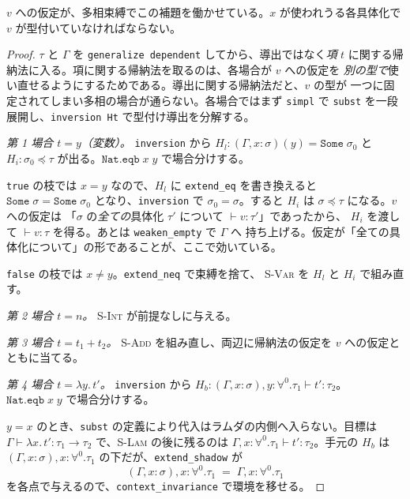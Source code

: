 \documentclass[11pt,a4paper]{ltjsarticle}
\newcommand{\inst}{\preceq}
\begin{document}
$v$ への仮定が、多相束縛でこの補題を働かせている。$x$ が使われうる各具体化で
$v$ が型付いていなければならない。

\begin{proof}
$\tau$ と $\Gamma$ を \texttt{generalize dependent} してから、導出ではなく\emph{項}
$t$ に関する帰納法に入る。項に関する帰納法を取るのは、各場合が $v$ への仮定を
\emph{別の型で}使い直せるようにするためである。導出に関する帰納法だと、$v$ の型が
一つに固定されてしまい多相の場合が通らない。各場合ではまず \texttt{simpl} で
\texttt{subst} を一段展開し、\texttt{inversion Ht} で型付け導出を分解する。

\medskip
\emph{第 1 場合 $t = y$（変数）。} \texttt{inversion} から
$H_l : (\Gamma, x{:}\sigma)(y) = \mathtt{Some}\;\sigma_0$ と
$H_i : \sigma_0 \inst \tau$ が出る。$\mathtt{Nat.eqb}\;x\;y$ で場合分けする。

\texttt{true} の枝では $x = y$ なので、$H_l$ に \texttt{extend\_eq} を書き換えると
$\mathtt{Some}\;\sigma = \mathtt{Some}\;\sigma_0$ となり、\texttt{inversion} で
$\sigma_0 = \sigma$。すると $H_i$ は $\sigma \inst \tau$ になる。$v$ への仮定は
「$\sigma$ の\emph{全ての}具体化 $\tau'$ について $\vdash v : \tau'$」であったから、
$H_i$ を渡して $\vdash v : \tau$ を得る。あとは \texttt{weaken\_empty} で $\Gamma$ へ
持ち上げる。仮定が「全ての具体化について」の形であることが、ここで効いている。

\texttt{false} の枝では $x \neq y$。\texttt{extend\_neq} で束縛を捨て、
\textsc{S-Var} を $H_l$ と $H_i$ で組み直す。

\medskip
\emph{第 2 場合 $t = n$。} \textsc{S-Int} が前提なしに与える。

\medskip
\emph{第 3 場合 $t = t_1 + t_2$。} \textsc{S-Add} を組み直し、両辺に帰納法の仮定を
$v$ への仮定とともに当てる。

\medskip
\emph{第 4 場合 $t = \lambda y.\,t'$。} \texttt{inversion} から
$H_b : (\Gamma, x{:}\sigma), y{:}\forall^{0}.\tau_1 \vdash t' : \tau_2$。
$\mathtt{Nat.eqb}\;x\;y$ で場合分けする。

$y = x$ のとき、\texttt{subst} の定義により代入はラムダの内側へ入らない。目標は
$\Gamma \vdash \lambda x.\,t' : \tau_1 \to \tau_2$ で、\textsc{S-Lam} の後に残るのは
$\Gamma, x{:}\forall^{0}.\tau_1 \vdash t' : \tau_2$。手元の $H_b$ は
$(\Gamma, x{:}\sigma), x{:}\forall^{0}.\tau_1$ の下だが、\texttt{extend\_shadow} が
\[
  (\Gamma, x{:}\sigma), x{:}\forall^{0}.\tau_1 \;=\; \Gamma, x{:}\forall^{0}.\tau_1
\]
を各点で与えるので、\texttt{context\_invariance} で環境を移せる。


\end{proof}
\end{document}
